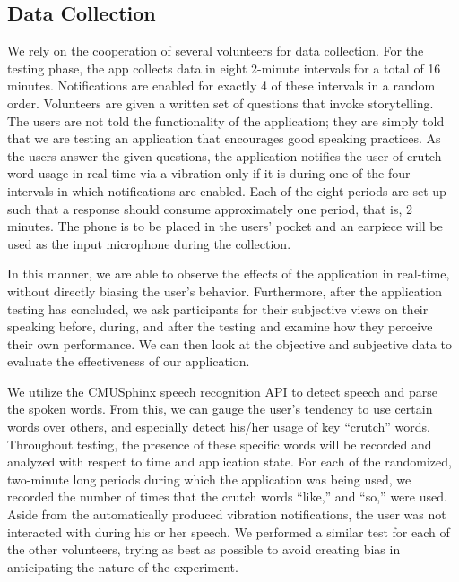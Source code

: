 \documentclass{sigchi}
\begin{document}
\subsection{Data Collection}

We rely on the cooperation of several volunteers for data collection. For the testing phase, the app collects data in eight 2-minute intervals for a total of 16 minutes. Notifications are enabled for exactly 4 of these intervals in a random order. Volunteers are given a written set of questions that invoke storytelling. The users are not told the functionality of the application; they are simply told that we are testing an application that encourages good speaking practices. As the users answer the given questions, the application notifies the user of crutch-word usage in real time via a vibration only if it is during one of the four intervals in which notifications are enabled. Each of the eight periods are set up such that a response should consume approximately one period, that is, 2 minutes. The phone is to be placed in the users’ pocket and an earpiece will be used as the input microphone during the collection.

In this manner, we are able to observe the effects of the application in real-time, without directly biasing the user’s behavior. Furthermore, after the application testing has concluded, we ask participants for their subjective views on their speaking before, during, and after the testing and examine how they perceive their own performance. We can then look at the objective and subjective data to evaluate the effectiveness of our application.

We utilize the CMUSphinx speech recognition API to detect speech and parse the spoken words. From this, we can gauge the user’s tendency to use certain words over others, and especially detect his/her usage of key “crutch” words. Throughout testing, the presence of these specific words will be recorded and analyzed with respect to time and application state.  For each of the randomized, two-minute long periods during which the application was being used, we recorded the number of times that the crutch words “like,” and “so,” were used. Aside from the automatically produced vibration notifications, the user was not interacted with during his or her speech. We performed a similar test for each of the other volunteers, trying as best as possible to avoid creating bias in anticipating the nature of the experiment.
\end{document}
